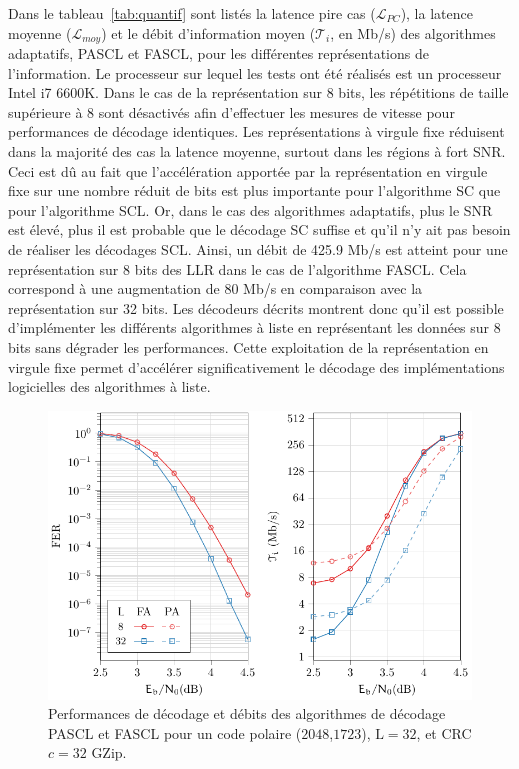 Dans le tableau~\ref{tab:quantif} sont listés la latence \og pire cas \fg ($\mathcal{L}_{PC}$), la latence moyenne ($\mathcal{L}_{moy}$) et le débit d'information moyen ($\mathcal{T}_i$, en Mb/s) des algorithmes adaptatifs, PASCL et FASCL, pour les différentes représentations de l'information. Le processeur sur lequel les tests ont été réalisés est un processeur Intel i7 6600K. Dans le cas de la représentation sur 8 bits, les \noeuds répétitions de taille supérieure à 8 sont désactivés afin d'effectuer les mesures de vitesse pour performances de décodage identiques. Les représentations à virgule fixe réduisent dans la majorité des cas la latence moyenne, surtout dans les régions à fort SNR. Ceci est dû au fait que l'accélération apportée par la représentation en virgule fixe sur une nombre réduit de bits est plus importante pour l'algorithme SC que pour l'algorithme SCL. Or, dans le cas des algorithmes adaptatifs, plus le SNR est élevé, plus il est probable que le décodage SC suffise et qu'il n'y ait pas besoin de réaliser les décodages SCL. Ainsi, un débit de 425.9 Mb/s est atteint pour une représentation sur 8 bits des LLR dans le cas de l'algorithme FASCL. Cela correspond à une augmentation de 80 Mb/s en comparaison avec la représentation sur 32 bits. Les décodeurs décrits montrent donc qu'il est possible d'implémenter les différents algorithmes à liste en représentant les données sur 8 bits sans dégrader les performances. Cette exploitation de la représentation en virgule fixe permet d'accélérer significativement le décodage des  implémentations logicielles des algorithmes à liste.

\begin{figure}[t]
\includegraphics{main/ch2_fig/curves/ascl/tikz/ascl}
\caption{Performances de décodage et débits des algorithmes de décodage PASCL et FASCL pour un code polaire ($2048$,$1723$), $\mathrm{L}=32$, et CRC $c=32$ GZip.}
\label{fig:ascl_perfs}
\end{figure}


